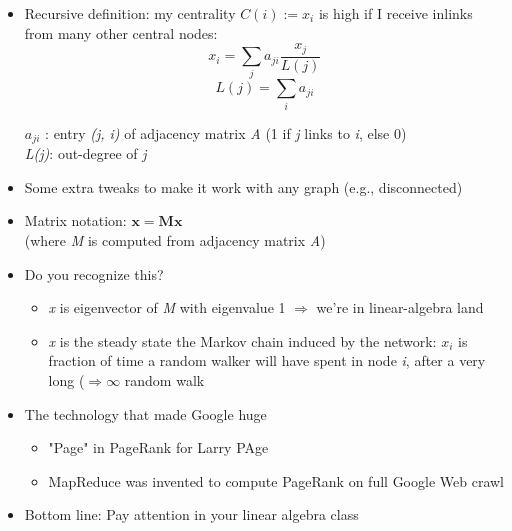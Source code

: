 \documentclass[11pt]{article}
\begin{document}
\begin{itemize}
	\item Recursive definition: my centrality $C(i) := x_i$ is high if I receive inlinks from many other central nodes:
		\[
			x_i = \sum\limits_j a_{ji} \frac{x_j}{L(j)} 
                \]
		\[
			L(j) = \sum\limits_i a_{ji}
		\] 
		\begin{tcolorbox}[
		  colback=gray!15,     %
		  colframe=black!50,    %
		  boxrule=1pt,       %
		  arc=3mm,             %
		  left=4mm, right=4mm, top=2mm, bottom=2mm %
		]
		$a_{ji}$ : entry \textit{(j, i)} of adjacency matrix \textit{A} (1 if \textit{j} links to \textit{i}, else 0) \\
		\textit{L(j)}: out-degree of \textit{j}
		\end{tcolorbox}
	\item Some extra tweaks to make it work with any graph (e.g., disconnected)
	\item Matrix notation: $\mathbf{x = Mx}$ \\
	(where \textit{M} is computed from adjacency matrix \textit{A})
	\item Do you recognize this?
		\begin{itemize}
			\item \textit{x} is eigenvector of \textit{M} with eigenvalue 1 $\Rightarrow$ we're in linear-algebra land
			\item \textit{x} is the steady state the Markov chain induced by the network: $x_i$ is fraction of time a random walker will have spent in node \textit{i}, after a very long ($\Rightarrow \infty$ random walk
		\end{itemize}
	\item The technology that made Google huge
		\begin{itemize}
			\item "Page" in PageRank for Larry PAge
			\item MapReduce was invented to compute PageRank on full Google Web crawl
		\end{itemize}
	\item Bottom line: Pay attention in your linear algebra class
\end{itemize}
\end{document}
